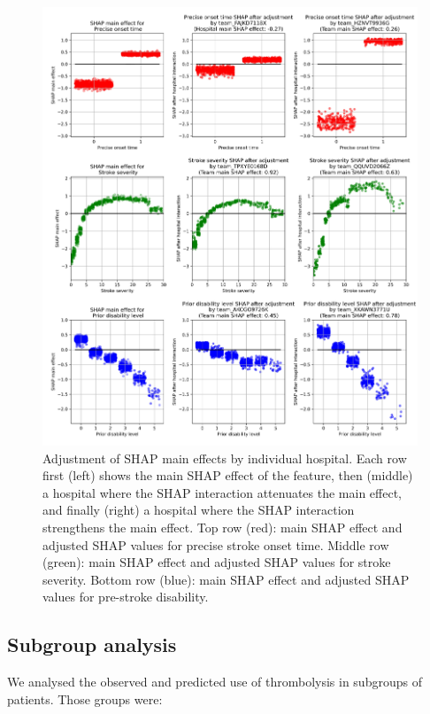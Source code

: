 \begin{figure}
\centering
\includegraphics[width=1.0\textwidth]{./images/12aa_three_way_shap_adjustment}
\caption{Adjustment of SHAP main effects by individual hospital. Each row first (left) shows the main SHAP effect of the feature, then (middle) a hospital where the SHAP interaction attenuates the main effect, and finally (right) a hospital where the SHAP interaction strengthens the main effect. Top row (red): main SHAP effect and adjusted SHAP values for precise stroke onset time. Middle row (green): main SHAP effect and adjusted SHAP values for stroke severity. Bottom row (blue): main SHAP effect and adjusted SHAP values for pre-stroke disability.}
\label{fig:results_shap_hosp_intercations}
\end{figure}


\subsection{Subgroup analysis}

We analysed the observed and predicted use of thrombolysis in subgroups of patients. Those groups were:

